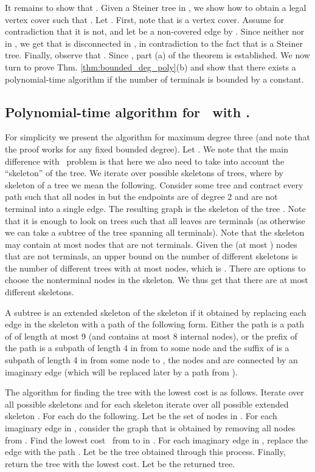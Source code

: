 \documentclass[12pt]{article}
\newcommand{\PS}[0]{ 
}
\newcommand{\PP}[0]{ }
\begin{document}
It remains to show that .
Given a Steiner tree  in , we show how to obtain  a legal vertex cover  such that .
Let . First, note that  is a vertex cover. Assume for contradiction that it is not, and let  be a non-covered edge by .
Since neither  nor  in , we get that  is disconnected in , in contradiction to the fact that  is a Steiner tree. Finally, observe that
. Since ,
part (a) of the theorem is established.
We now turn to prove Thm. \ref{thm:bounded_deg_poly}(b) and show that there exists a polynomial-time algorithm if the number of terminals is bounded by a constant.
\subsection{Polynomial-time algorithm for \PS\ with .}
\label{subsec:multiterminals}
For simplicity we present the algorithm for maximum degree three (and note that the proof works for any fixed bounded degree).
Let . We note that the main difference with \PS\ problem is that here we also need to take into account the ``skeleton'' of the tree.
We iterate over possible skeletons of trees, where by skeleton of a tree we mean the following.
Consider some tree  and contract every path  such that all nodes in  but the endpoints are of degree 2 and are not terminal into a single edge. The resulting graph is the skeleton of the tree . Note that it is enough to look on trees  such that all leaves are terminals (as otherwise we can take a subtree of the tree spanning all terminals).
Note that the skeleton may contain at most  nodes that are not terminals.
Given the (at most ) nodes that are not terminals, an upper bound on the number of different skeletons is the number of different trees with at most  nodes, which is . There are  options to choose the nonterminal nodes in the skeleton.
We thus get that there are at most  different skeletons.

A subtree  is an extended skeleton of the skeleton  if it obtained by replacing each edge  in the skeleton  with a path  of the following form. Either the path  is a path of  of length at most 9 (and contains at most 8 internal nodes), or the prefix of the path  is a subpath of length 4 in  from  to some node  and the suffix of  is a subpath of length 4 in  from some node  to , the nodes  and  are connected by an imaginary edge (which will be replaced later by a path from ).

The algorithm for finding the tree with the lowest cost  is as follows.
Iterate over all possible skeletons  and for each skeleton  iterate over all possible extended skeleton .
For each  do the following. Let  be the set of nodes in .
For each imaginary edge  in , consider the graph  that is obtained by removing all nodes  from .
Find the lowest cost \PP\  from  to  in .
For each imaginary edge  in , replace the edge with the path . Let  be the tree obtained through this process.
Finally, return the tree  with the lowest cost.
Let  be the returned tree.
\end{document}
